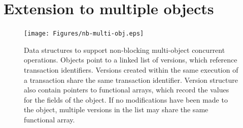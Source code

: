 \section{Extension to multiple objects}
\begin{figure}[t]\centering
\texttt{[image: Figures/nb-multi-obj.eps]}
\caption[Data structures to support non-blocking multi-object
  concurrent operations.]{Data structures to support non-blocking multi-object
  concurrent operations.  Objects point to a linked list of versions,
  which reference transaction identifiers.  Versions created within the
  same execution of a transaction share the same transaction
  identifier.  Version structure also contain pointers to functional
  arrays, which record the values for the fields of the object.
  If no modifications have been made to the object, multiple versions
  in the list may share the same functional array.}
\label{fig:multi-o}
\end{figure}
